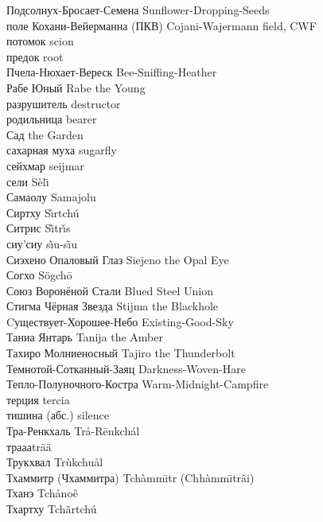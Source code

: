 \documentclass[a4paper,10pt,fleqn]{book}
\newcommand{\ldotst}{\so{...}\xspace}
\begin{document}
Подсолнух-Бросает-Семена \hfill Sunflower-Dropping-Seeds\\
поле Кохани-Вейерманна (ПКВ) \hfill Cojani-Wajermann field, CWF\\
потомок \hfill scion\\
предок \hfill root\\
Пчела-Нюхает-Вереск \hfill Bee-Sniffing-Heather\\
Рабе Юный \hfill Rabe the Young\\
разрушитель \hfill destructor\\
родильница \hfill bearer\\
Сад \hfill the Garden\\
сахарная муха \hfill sugarfly\\
сейхмар \hfill seijmar\\
сели \hfill S\r{e}l\={\i}\\
Самаолу \hfill Samajolu\\
Сиртху \hfill S\r{\i}rtch\'{u}\\
Ситрис \hfill S\~{\i}tr\v{\i}s\\
сиу'сиу \hfill s\~{\i}u-s\~{\i}u\\
Сиэхено Опаловый Глаз \hfill Siejeno the Opal Eye\\
Согхо \hfill S\"{o}gch\={o}\\
Союз Воронёной Стали \hfill Blued Steel Union\\
Стигма Чёрная Звезда \hfill Stijma the Blackhole\\
Cуществует-Хорошее-Небо \hfill Existing-Good-Sky\\
Таниа Янтарь \hfill Tanija the Amber\\
Тахиро Молниеносный \hfill Tajiro the Thunderbolt\\
Темнотой-Сотканный-Заяц \hfill Darkness-Woven-Hare\\
Тепло-Полуночного-Костра \hfill Warm-Midnight-Campfire\\
терция \hfill tercia\\
тишина (абс.) \hfill silence\\
Тра-Ренкхаль \hfill Tr\r{a}-R\={e}nkch\'{a}l\\
трааа\ldotst \hfill tr\={a}\"{a}\ldotst \\
Трукхвал \hfill Tr\`{u}kchu\r{a}l\\
Тхаммитр (Чхаммитра) \hfill Tch\`{a}mm\={\i}tr (Chh\`{a}mm\={\i}tr\^{a}i)\\
Тханэ \hfill Tch\r{a}no\^{e}\\
Тхартху \hfill Tch\~{a}rtch\'{u}\\
\end{document}
